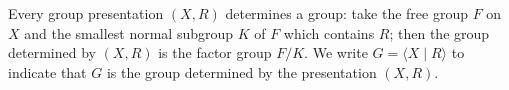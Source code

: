 Every group presentation $(X, R)$ determines a group: take the free group $F$ on $X$ and the smallest normal subgroup $K$ of $F$ which contains $R$; then the group determined by $(X, R)$ is the factor group $F/K$. We write $G = \langle X \mid R \rangle$ to indicate that $G$ is the group determined by the presentation $(X, R)$.
